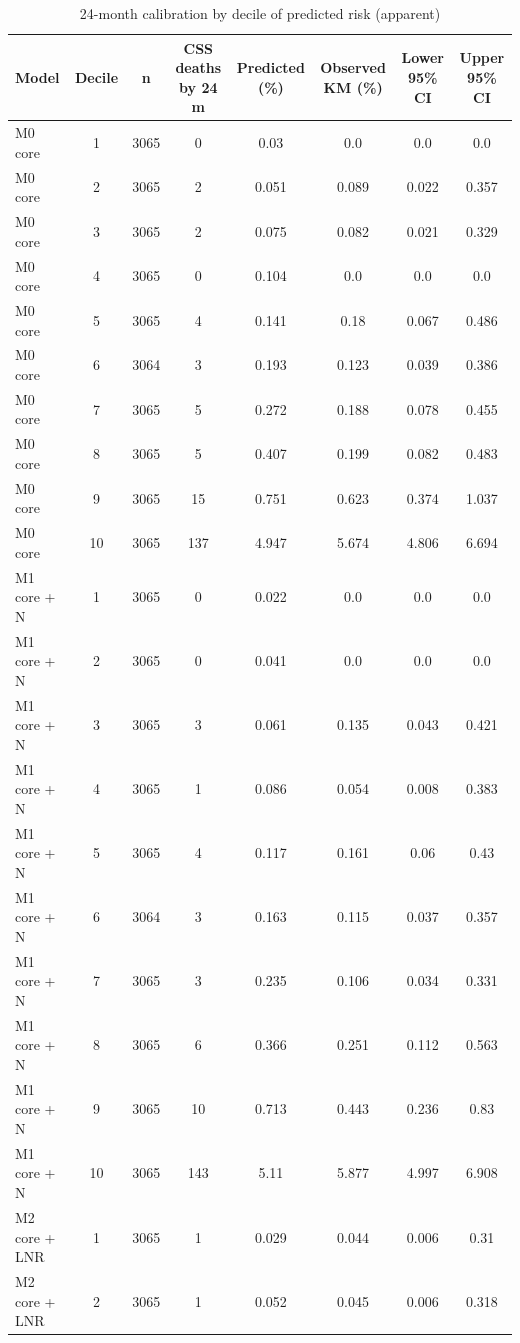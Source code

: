 \begin{table}[htbp]
\caption{24-month calibration by decile of predicted risk (apparent)}\label{tab:s19_calibration_deciles}
\scriptsize
\begin{tabular*}{\textwidth}{@{\extracolsep{\fill}}lccccccc@{}}
\toprule
Model & Decile & n & CSS deaths by 24 m & Predicted (\%) & Observed KM (\%) & Lower 95\% CI & Upper 95\% CI \\
\midrule
M0 core & 1 & 3065 & 0 & 0.03 & 0.0 & 0.0 & 0.0 \\
M0 core & 2 & 3065 & 2 & 0.051 & 0.089 & 0.022 & 0.357 \\
M0 core & 3 & 3065 & 2 & 0.075 & 0.082 & 0.021 & 0.329 \\
M0 core & 4 & 3065 & 0 & 0.104 & 0.0 & 0.0 & 0.0 \\
M0 core & 5 & 3065 & 4 & 0.141 & 0.18 & 0.067 & 0.486 \\
M0 core & 6 & 3064 & 3 & 0.193 & 0.123 & 0.039 & 0.386 \\
M0 core & 7 & 3065 & 5 & 0.272 & 0.188 & 0.078 & 0.455 \\
M0 core & 8 & 3065 & 5 & 0.407 & 0.199 & 0.082 & 0.483 \\
M0 core & 9 & 3065 & 15 & 0.751 & 0.623 & 0.374 & 1.037 \\
M0 core & 10 & 3065 & 137 & 4.947 & 5.674 & 4.806 & 6.694 \\
M1 core + N & 1 & 3065 & 0 & 0.022 & 0.0 & 0.0 & 0.0 \\
M1 core + N & 2 & 3065 & 0 & 0.041 & 0.0 & 0.0 & 0.0 \\
M1 core + N & 3 & 3065 & 3 & 0.061 & 0.135 & 0.043 & 0.421 \\
M1 core + N & 4 & 3065 & 1 & 0.086 & 0.054 & 0.008 & 0.383 \\
M1 core + N & 5 & 3065 & 4 & 0.117 & 0.161 & 0.06 & 0.43 \\
M1 core + N & 6 & 3064 & 3 & 0.163 & 0.115 & 0.037 & 0.357 \\
M1 core + N & 7 & 3065 & 3 & 0.235 & 0.106 & 0.034 & 0.331 \\
M1 core + N & 8 & 3065 & 6 & 0.366 & 0.251 & 0.112 & 0.563 \\
M1 core + N & 9 & 3065 & 10 & 0.713 & 0.443 & 0.236 & 0.83 \\
M1 core + N & 10 & 3065 & 143 & 5.11 & 5.877 & 4.997 & 6.908 \\
M2 core + LNR & 1 & 3065 & 1 & 0.029 & 0.044 & 0.006 & 0.31 \\
M2 core + LNR & 2 & 3065 & 1 & 0.052 & 0.045 & 0.006 & 0.318 \\

\end{tabular*}
\end{table}
